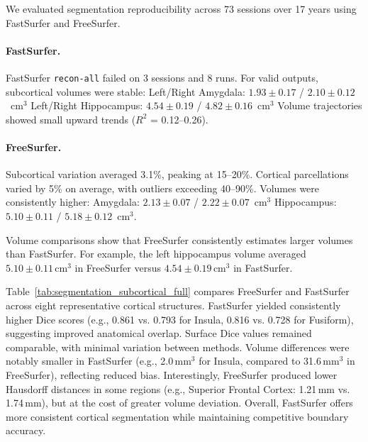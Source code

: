 \documentclass{midl} %
\begin{document}
We evaluated segmentation reproducibility across 73 sessions over 17 years using FastSurfer and FreeSurfer.

\paragraph{FastSurfer.}
FastSurfer \texttt{recon-all} failed on 3 sessions and 8 runs. For valid outputs, subcortical volumes were stable:  
Left/Right Amygdala: $1.93 \pm 0.17$ / $2.10 \pm 0.12$~cm$^3$  
Left/Right Hippocampus: $4.54 \pm 0.19$ / $4.82 \pm 0.16$~cm$^3$  
Volume trajectories showed small upward trends ($R^2$ = 0.12--0.26).

\paragraph{FreeSurfer.}
Subcortical variation averaged 3.1\%, peaking at 15--20\%.  
Cortical parcellations varied by 5\% on average, with outliers exceeding 40--90\%.  
Volumes were consistently higher:  
Amygdala: $2.13 \pm 0.07$ / $2.22 \pm 0.07$~cm$^3$  
Hippocampus: $5.10 \pm 0.11$ / $5.18 \pm 0.12$~cm$^3$.

Volume comparisons show that FreeSurfer consistently estimates larger volumes than FastSurfer. For example, the left hippocampus volume averaged $5.10 \pm 0.11\,\text{cm}^3$ in FreeSurfer versus $4.54 \pm 0.19\,\text{cm}^3$ in FastSurfer.

Table~\ref{tab:segmentation_subcortical_full} compares FreeSurfer and FastSurfer across eight representative cortical structures. FastSurfer yielded consistently higher Dice scores (e.g., 0.861 vs. 0.793 for Insula, 0.816 vs. 0.728 for Fusiform), suggesting improved anatomical overlap. Surface Dice values remained comparable, with minimal variation between methods. Volume differences were notably smaller in FastSurfer (e.g., 2.0\,mm$^3$ for Insula, compared to 31.6\,mm$^3$ in FreeSurfer), reflecting reduced bias. Interestingly, FreeSurfer produced lower Hausdorff distances in some regions (e.g., Superior Frontal Cortex: 1.21\,mm vs. 1.74\,mm), but at the cost of greater volume deviation. Overall, FastSurfer offers more consistent cortical segmentation while maintaining competitive boundary accuracy.
\end{document}
